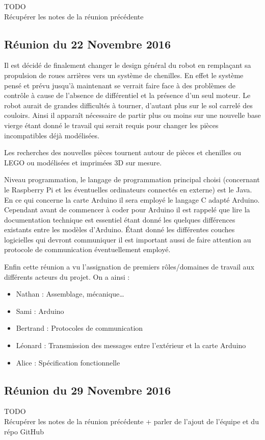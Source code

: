 \documentclass{article}
\begin{document}
        TODO\\
        Récupérer les notes de la réunion précédente
        
    \subsection{Réunion du 22 Novembre 2016}

        Il est décidé de finalement changer le design général du robot en remplaçant sa propulsion de roues arrières vers un système de chenilles. En effet le système pensé et prévu jusqu'à maintenant se verrait faire face à des problèmes de contrôle à cause de l'absence de différentiel et la présence d'un seul moteur. Le robot aurait de grandes difficultés à tourner, d'autant plus sur le sol carrelé des couloirs. Ainsi il apparaît nécessaire de partir plus ou moins sur une nouvelle base vierge étant donné le travail qui serait requis pour changer les pièces incompatibles déjà modélisées.
        \newline
        
        Les recherches des nouvelles pièces tournent autour de pièces et chenilles ou LEGO ou modélisées et imprimées 3D sur mesure.
        \newline
        
        Niveau programmation, le langage de programmation principal choisi (concernant le Raspberry Pi et les éventuelles ordinateurs connectés en externe) est le Java. En ce qui concerne la carte Arduino il sera employé le langage C adapté Arduino.\\
        Cependant avant de commencer à coder pour Arduino il est rappelé que lire la documentation technique est essentiel étant donné les quelques différences existants entre les modèles d'Arduino. Étant donné les différentes couches logicielles qui devront communiquer il est important aussi de faire attention au protocole de communication éventuellement employé.
        \newline
        
        Enfin cette réunion a vu l'assignation de premiers rôles/domaines de travail aux différents acteurs du projet. On a ainsi :
        \begin{itemize}
            \item Nathan  : Assemblage, mécanique\dots
            \item Sami  : Arduino
            \item Bertrand  : Protocoles de communication
            \item Léonard  : Transmission des messages entre l'extérieur et la carte Arduino
            \item Alice  : Spécification fonctionnelle
        \end{itemize}

    \subsection{Réunion du 29 Novembre 2016}

        TODO\\
        Récupérer les notes de la réunion précédente + parler de l'ajout de l'équipe et du répo GitHub
\end{document}
